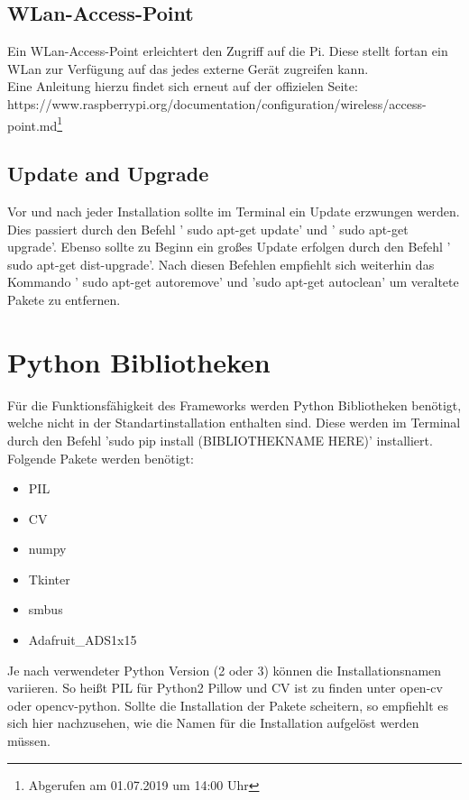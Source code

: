 \documentclass[twoside,12pt,a4paper]{report}
\begin{document}
	
	\subsection{WLan-Access-Point}
	Ein WLan-Access-Point erleichtert den Zugriff auf die Pi. Diese stellt fortan ein WLan zur Verfügung auf das jedes externe Gerät zugreifen kann. \\
	Eine Anleitung hierzu findet sich erneut auf der offizielen Seite:\\
	https://www.raspberrypi.org/documentation/configuration/wireless/access-point.md\footnote{Abgerufen am 01.07.2019 um 14:00 Uhr}
	
	\subsection{Update and Upgrade}
	Vor und nach jeder Installation sollte im Terminal ein Update erzwungen werden. Dies passiert durch den Befehl ' sudo apt-get update' und ' sudo apt-get upgrade'. Ebenso sollte zu Beginn ein großes Update erfolgen durch den Befehl ' sudo apt-get dist-upgrade'. Nach diesen Befehlen empfiehlt sich weiterhin das Kommando ' sudo apt-get autoremove' und 'sudo apt-get autoclean' um veraltete Pakete zu entfernen. 
	
	\section{Python Bibliotheken}
	
	Für die Funktionsfähigkeit des Frameworks werden Python Bibliotheken benötigt, welche nicht in der Standartinstallation enthalten sind. Diese werden im Terminal durch den Befehl 'sudo pip install (BIBLIOTHEKNAME HERE)' installiert.\\
	Folgende Pakete werden benötigt: 
	\begin{center}
		\begin{itemize}
			\item PIL
			\item CV
			\item numpy
			\item Tkinter
			\item smbus
			\item Adafruit\_ADS1x15
		\end{itemize}
	\end{center}
	Je nach verwendeter Python Version (2 oder 3) können die Installationsnamen variieren. So heißt PIL für Python2 Pillow und CV ist zu finden unter open-cv oder opencv-python. Sollte die Installation der Pakete scheitern, so empfiehlt es sich hier nachzusehen, wie die Namen für die Installation aufgelöst werden müssen. 
	
\end{document}

